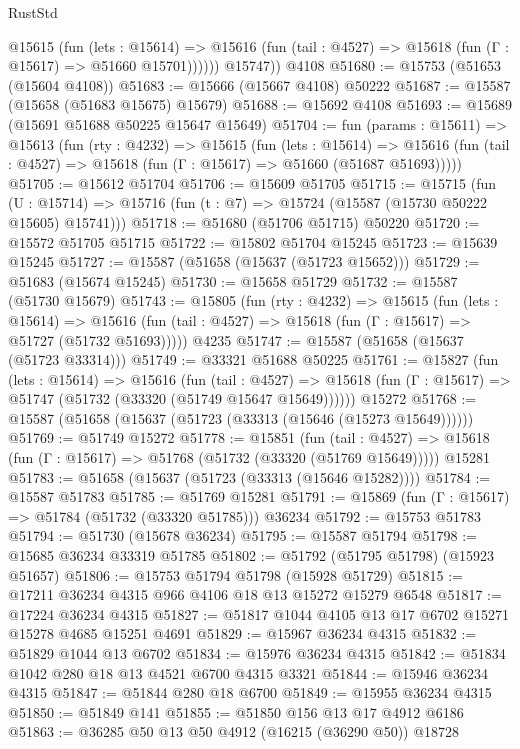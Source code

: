 \begin{lexlean}{RustStd}
\begin{coremodule}
            @15615
              (fun (lets : @15614) =>
              @15616 (fun (tail : @4527) => @15618 (fun (Γ : @15617) => @51660 @15701))))))
        @15747))
    @4108
@51680 := @15753 (@51653 (@15604 @4108))
@51683 := @15666 (@15667 @4108) @50222
@51687 := @15587 (@15658 (@51683 @15675) @15679)
@51688 := @15692 @4108
@51693 := @15689 (@15691 @51688 @50225 @15647 @15649)
@51704 := fun (params : @15611) =>
  @15613
    (fun (rty : @4232) =>
    @15615
      (fun (lets : @15614) =>
      @15616 (fun (tail : @4527) => @15618 (fun (Γ : @15617) => @51660 (@51687 @51693)))))
@51705 := @15612 @51704
@51706 := @15609 @51705
@51715 := @15715
    (fun (U : @15714) => @15716 (fun (t : @7) => @15724 (@15587 (@15730 @50222 @15605) @15741)))
@51718 := @51680 (@51706 @51715) @50220
@51720 := @15572 @51705 @51715
@51722 := @15802 @51704 @15245
@51723 := @15639 @15245
@51727 := @15587 (@51658 (@15637 (@51723 @15652)))
@51729 := @51683 (@15674 @15245)
@51730 := @15658 @51729
@51732 := @15587 (@51730 @15679)
@51743 := @15805
    (fun (rty : @4232) =>
    @15615
      (fun (lets : @15614) =>
      @15616 (fun (tail : @4527) => @15618 (fun (Γ : @15617) => @51727 (@51732 @51693)))))
    @4235
@51747 := @15587 (@51658 (@15637 (@51723 @33314)))
@51749 := @33321 @51688 @50225
@51761 := @15827
    (fun (lets : @15614) =>
    @15616
      (fun (tail : @4527) =>
      @15618 (fun (Γ : @15617) => @51747 (@51732 (@33320 (@51749 @15647 @15649))))))
    @15272
@51768 := @15587 (@51658 (@15637 (@51723 (@33313 (@15646 (@15273 @15649))))))
@51769 := @51749 @15272
@51778 := @15851
    (fun (tail : @4527) => @15618 (fun (Γ : @15617) => @51768 (@51732 (@33320 (@51769 @15649)))))
    @15281
@51783 := @51658 (@15637 (@51723 (@33313 (@15646 @15282))))
@51784 := @15587 @51783
@51785 := @51769 @15281
@51791 := @15869 (fun (Γ : @15617) => @51784 (@51732 (@33320 @51785))) @36234
@51792 := @15753 @51783
@51794 := @51730 (@15678 @36234)
@51795 := @15587 @51794
@51798 := @15685 @36234 @33319 @51785
@51802 := @51792 (@51795 @51798) (@15923 @51657)
@51806 := @15753 @51794 @51798 (@15928 @51729)
@51815 := @17211 @36234 @4315 @966 @4106 @18 @13 @15272 @15279 @6548
@51817 := @17224 @36234 @4315
@51827 := @51817 @1044 @4105 @13 @17 @6702 @15271 @15278 @4685 @15251 @4691
@51829 := @15967 @36234 @4315
@51832 := @51829 @1044 @13 @6702
@51834 := @15976 @36234 @4315
@51842 := @51834 @1042 @280 @18 @13 @4521 @6700 @4315 @3321
@51844 := @15946 @36234 @4315
@51847 := @51844 @280 @18 @6700
@51849 := @15955 @36234 @4315
@51850 := @51849 @141
@51855 := @51850 @156 @13 @17 @4912 @6186
@51863 := @36285 @50 @13 @50 @4912 (@16215 (@36290 @50)) @18728

\end{coremodule}
\end{lexlean}
